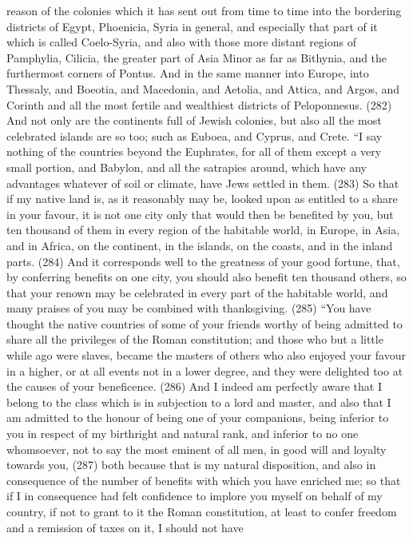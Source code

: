 reason of the colonies which it has sent out from time to time into the bordering districts of Egypt,
Phoenicia, Syria in general, and especially that part of it which is called Coelo-Syria, and also with
those more distant regions of Pamphylia, Cilicia, the greater part of Asia Minor as far as Bithynia,
and the furthermost corners of Pontus. And in the same manner into Europe, into Thessaly, and
Boeotia, and Macedonia, and Aetolia, and Attica, and Argos, and Corinth and all the most fertile
and wealthiest districts of Peloponnesus. (282) And not only are the continents full of Jewish
colonies, but also all the most celebrated islands are so too; such as Euboea, and Cyprus, and
Crete. ``I say nothing of the countries beyond the Euphrates, for all of them except a very small
portion, and Babylon, and all the satrapies around, which have any advantages whatever of soil or
climate, have Jews settled in them. (283) So that if my native land is, as it reasonably may be,
looked upon as entitled to a share in your favour, it is not one city only that would then be benefited
by you, but ten thousand of them in every region of the habitable world, in Europe, in Asia, and in
Africa, on the continent, in the islands, on the coasts, and in the inland parts. (284) And it
corresponds well to the greatness of your good fortune, that, by conferring benefits on one city,
you should also benefit ten thousand others, so that your renown may be celebrated in every part
of the habitable world, and many praises of you may be combined with thanksgiving. (285) ``You
have thought the native countries of some of your friends worthy of being admitted to share all the
privileges of the Roman constitution; and those who but a little while ago were slaves, became the
masters of others who also enjoyed your favour in a higher, or at all events not in a lower degree,
and they were delighted too at the causes of your beneficence. (286) And I indeed am perfectly
aware that I belong to the class which is in subjection to a lord and master, and also that I am
admitted to the honour of being one of your companions, being inferior to you in respect of my
birthright and natural rank, and inferior to no one whomsoever, not to say the most eminent of all
men, in good will and loyalty towards you, (287) both because that is my natural disposition, and
also in consequence of the number of benefits with which you have enriched me; so that if I in
consequence had felt confidence to implore you myself on behalf of my country, if not to grant to it
the Roman constitution, at least to confer freedom and a remission of taxes on it, I should not have
